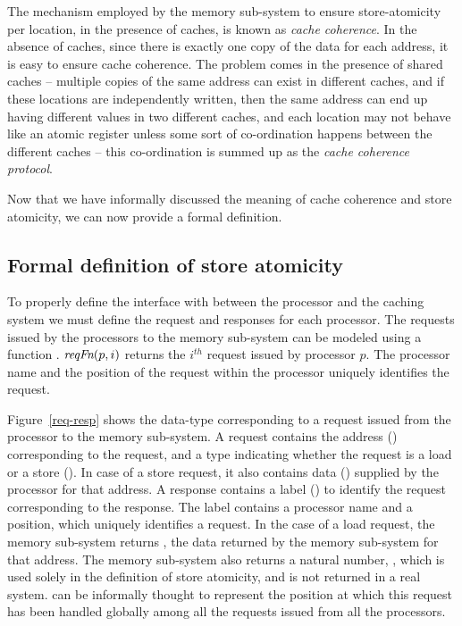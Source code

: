 

The mechanism employed by the memory sub-system to ensure store-atomicity per
location, in the presence of caches, is known as \emph{cache coherence}. In the
absence of caches, since there is exactly one copy of the data for each
address, it is easy to ensure cache coherence. The problem comes in the
presence of shared caches -- multiple copies of the same address can exist in
different caches, and if these locations are independently written, then the
same address can end up having different values in two different caches, and
each location may not behave like an atomic register unless some sort of
co-ordination happens between the different caches -- this co-ordination is
summed up as the \emph{cache coherence protocol}.

Now that we have informally discussed the meaning of cache coherence and store
atomicity, we can now provide a formal definition.

\subsection{Formal definition of store atomicity}

To properly define the interface with between the processor and the
caching system we must define the request and responses for each
processor. 
The requests issued by the processors to the memory sub-system can be modeled
using a function \reqFn. $\textit{reqFn}(p, i)$ returns the $i^{th}$ request issued by
processor $p$.
The processor name and the position of the request within the processor
uniquely identifies the request.

Figure~\ref{req-resp} shows the
data-type corresponding to a request issued from the processor to the
memory sub-system.  A request contains the address (\addrQ)
corresponding to the request, and a type indicating whether the
request is a load or a store (\desc). In case of a store request, it
also contains data (\dataQ) supplied by the processor for that
address. A response contains a label
() to identify the request corresponding to the response. The label
contains a processor name and a position, which uniquely identifies a request.
In the case of a load request, the memory sub-system returns \dataR, the data
returned by the memory sub-system for that address. The memory sub-system also
returns a natural number, \timeR, which is used solely in the definition of
store atomicity, and is not returned in a real system. \timeR{} can be informally
thought to represent the position at which this request has been handled
globally among all the requests issued from all the processors.

